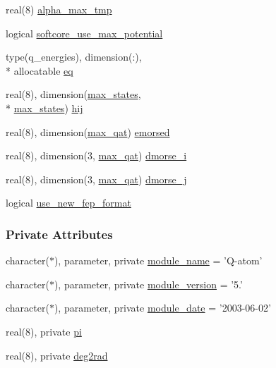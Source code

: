 \begin{DoxyCompactItemize}
real(8) \hyperlink{classqatom_a1c31e7a76874fa00e07aa110513040f4}{alpha\-\_\-max\-\_\-tmp}
\item 
logical \hyperlink{classqatom_a15eb3bdac362b92205027b5d76b11bf4}{softcore\-\_\-use\-\_\-max\-\_\-potential}
\item 
type(q\-\_\-energies), dimension(\-:), \\*
allocatable \hyperlink{classqatom_a1460f80a9398e8412e72c0f510d5af4d}{eq}
\item 
real(8), dimension(\hyperlink{classqatom_ad89179e7bcdef29e13211330d1b8fd20}{max\-\_\-states}, \\*
\hyperlink{classqatom_ad89179e7bcdef29e13211330d1b8fd20}{max\-\_\-states}) \hyperlink{classqatom_af43d041f4c6cd4cbdcb6a176ff0ecd62}{hij}
\item 
real(8), dimension(\hyperlink{classqatom_aed28407cee717496e5e81de3a1768577}{max\-\_\-qat}) \hyperlink{classqatom_a27e9080641bfc27dddb1925910a424f7}{emorsed}
\item 
real(8), dimension(3, \hyperlink{classqatom_aed28407cee717496e5e81de3a1768577}{max\-\_\-qat}) \hyperlink{classqatom_a3424db0cbb148216b22871cc6c1e054b}{dmorse\-\_\-i}
\item 
real(8), dimension(3, \hyperlink{classqatom_aed28407cee717496e5e81de3a1768577}{max\-\_\-qat}) \hyperlink{classqatom_a0cb9138f02b1243e97d04dc9c55d195f}{dmorse\-\_\-j}
\item 
logical \hyperlink{classqatom_ae60329e231213e5892113334daa1821e}{use\-\_\-new\-\_\-fep\-\_\-format}
\end{DoxyCompactItemize}
\subsubsection*{Private Attributes}
\begin{DoxyCompactItemize}
\item 
character($\ast$), parameter, private \hyperlink{classqatom_a80c441b3b38961821d4ad264eadda14f}{module\-\_\-name} = 'Q-\/atom'
\item 
character($\ast$), parameter, private \hyperlink{classqatom_af98e04952aced53fdd440012346897b2}{module\-\_\-version} = '5.'
\item 
character($\ast$), parameter, private \hyperlink{classqatom_a4ff02bb91e09846e9cfcc26a57bfd818}{module\-\_\-date} = '2003-\/06-\/02'
\item 
real(8), private \hyperlink{classqatom_a895c809a1075c6a8114729f30cea7d59}{pi}
\item 
real(8), private \hyperlink{classqatom_afa086ac14fec6687dfcc7f13d5cd599f}{deg2rad}
\end{DoxyCompactItemize}


